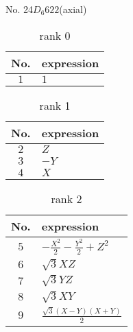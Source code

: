 \documentclass[fleqn,8pt,landscape]{jsarticle}
\begin{document}
\setcounter{MaxMatrixCols}{16}

\begin{center}
\LARGE
No. 24\quad$D_{6}$\quad$622$\quad[ hexagonal ] (axial)
\end{center}
\begin{table}[ht!]
\begin{center}
\caption{rank 0}
\renewcommand{\arraystretch}{1.3}
\begin{tabular}{cl} \hline \hline
No. & expression \\ \hline
$ 1 $ & $ 1 $ \\
 \hline \hline
\end{tabular}
\end{center}
\end{table}
\begin{table}[ht!]
\begin{center}
\caption{rank 1}
\renewcommand{\arraystretch}{1.3}
\begin{tabular}{cl} \hline \hline
No. & expression \\ \hline
$ 2 $ & $ Z $ \\
$ 3 $ & $ - Y $ \\
$ 4 $ & $ X $ \\
 \hline \hline
\end{tabular}
\end{center}
\end{table}
\begin{table}[ht!]
\begin{center}
\caption{rank 2}
\renewcommand{\arraystretch}{1.3}
\begin{tabular}{cl} \hline \hline
No. & expression \\ \hline
$ 5 $ & $ - \frac{X^{2}}{2} - \frac{Y^{2}}{2} + Z^{2} $ \\
$ 6 $ & $ \sqrt{3} X Z $ \\
$ 7 $ & $ \sqrt{3} Y Z $ \\
$ 8 $ & $ \sqrt{3} X Y $ \\
$ 9 $ & $ \frac{\sqrt{3} \left(X - Y\right) \left(X + Y\right)}{2} $ \\
 \hline \hline
\end{tabular}
\end{center}
\end{table}
\end{document}
